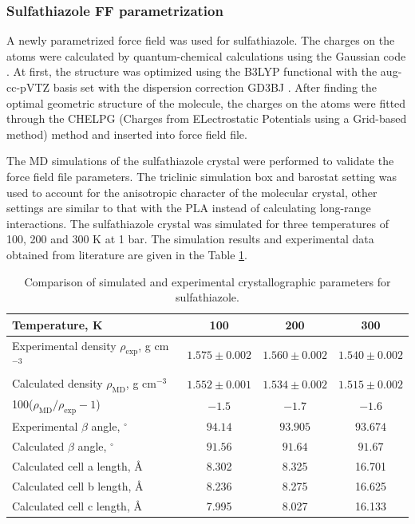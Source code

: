 \subsubsection{Sulfathiazole FF parametrization}
A newly parametrized force field \cite{jorgensen_development_1996} was used for sulfathiazole. The charges on the atoms were calculated by quantum-chemical calculations using the Gaussian code \cite{frisch_gaussian16_2016}. At first, the structure was optimized using the B3LYP functional with the aug-cc-pVTZ basis set with the dispersion correction GD3BJ \cite{smith_revised_2016}. After finding the optimal geometric structure of the molecule, the charges on the atoms were fitted through the CHELPG (Charges from ELectrostatic Potentials using a Grid-based method) method and inserted into force field file.
 
The MD simulations of the sulfathiazole crystal were performed to validate the force field file parameters. The triclinic simulation box and barostat setting was used to account for the anisotropic character of the molecular crystal, other settings are similar to that with the PLA instead of calculating long-range interactions. The sulfathiazole crystal was simulated for three temperatures of 100, 200 and 300 K at 1 bar. The simulation results and experimental data obtained from literature \cite{drebushchak_crystal_2008} are given in the Table \ref{tab:sulfathiazol}.
 
    \begin{table}[htb]       
	\centering
	\begin{tabular}{lccc}
		\toprule
		Temperature, K & 100 & 200 & 300\\
		\midrule
		Experimental density $\rho_\mathrm{exp}$, g cm$^{-3}$  & $1.575 \pm 0.002$ & $1.560 \pm 0.002$ & $1.540 \pm 0.002$\\
		Calculated density $\rho_\mathrm{MD}$, g cm$^{-3}$ & $1.552 \pm 0.001$ & $1.534 \pm 0.002$ & $1.515 \pm 0.002$\\
		100($\rho_\mathrm{MD}/\rho_\mathrm{exp}-1$) & $-1.5$ & $-1.7$ & $-1.6$\\
		\midrule
		Experimental $\beta$ angle, $^{\circ}$ & $94.14$ & $93.905$ & $93.674$\\
		
		Calculated $\beta$ angle, $^{\circ}$ & $91.56$ & $91.64$ & $91.67$\\
		
		Calculated cell a length, \AA & 8.302 & 8.325 & 16.701\\
		
		Calculated cell b length, \AA & 8.236 & 8.275 & 16.625\\
		
		Calculated cell c length, \AA & 7.995 & 8.027 & 16.133\\
		\bottomrule
	\end{tabular}
	\caption{Comparison of simulated and experimental crystallographic parameters for sulfathiazole.}
	\label{tab:sulfathiazol}
\end{table}

